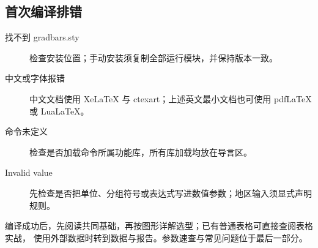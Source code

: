 \subsection{首次编译排错}
\begin{description}
\item[找不到 gradbars.sty] 检查安装位置；手动安装须复制全部运行模块，并保持版本一致。
\item[中文或字体报错] 中文文档使用 XeLaTeX 与 ctexart；上述英文最小文档也可使用 pdfLaTeX 或 LuaLaTeX。
\item[命令未定义] 检查是否加载命令所属功能库，所有库加载均放在导言区。
\item[Invalid value] 先检查是否把单位、分组符号或表达式写进数值参数；地区输入须显式声明规则。
\end{description}
编译成功后，先阅读共同基础，再按图形详解选型；已有普通表格可直接查阅表格实战，
使用外部数据时转到数据与报告。参数速查与常见问题位于最后一部分。
